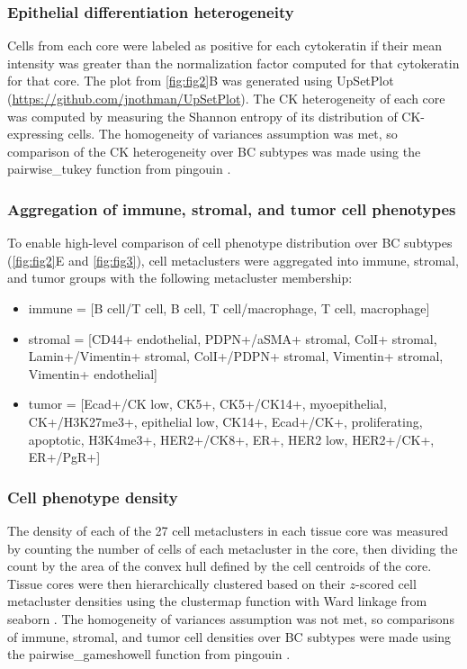 \documentclass[preprint,review,3p,12pt]{elsarticle}
\begin{document}
\subsubsection{Epithelial differentiation heterogeneity}
Cells from each core were labeled as positive for each cytokeratin if their mean intensity was greater than the normalization factor computed for that cytokeratin for that core. The plot from \autoref{fig:fig2}B was generated using UpSetPlot (\url{https://github.com/jnothman/UpSetPlot}). The CK heterogeneity of each core was computed by measuring the Shannon entropy of its distribution of CK-expressing cells. The homogeneity of variances assumption was met, so comparison of the CK heterogeneity over BC subtypes was made using the pairwise\_tukey function from pingouin \cite{pingouin2018}.

\subsubsection{Aggregation of immune, stromal, and tumor cell phenotypes} \label{aggregate}
To enable high-level comparison of cell phenotype distribution over BC subtypes (\autoref{fig:fig2}E and \autoref{fig:fig3}), cell metaclusters were aggregated into immune, stromal, and tumor groups with the following metacluster membership:
\begin{itemize}
    \item immune = [B cell/T cell, B cell, T cell/macrophage, T cell, macrophage]
    \item stromal = [CD44+ endothelial, PDPN+/aSMA+ stromal, ColI+ stromal, Lamin+/Vimentin+ stromal, ColI+/PDPN+ stromal, Vimentin+ stromal, Vimentin+ endothelial]
    \item tumor = [Ecad+/CK low, CK5+, CK5+/CK14+, myoepithelial, CK+/H3K27me3+, epithelial low, CK14+, Ecad+/CK+, proliferating, apoptotic, H3K4me3+, HER2+/CK8+, ER+, HER2 low, HER2+/CK+, ER+/PgR+]
\end{itemize}

\subsubsection{Cell phenotype density}
The density of each of the 27 cell metaclusters in each tissue core was measured by counting the number of cells of each metacluster in the core, then dividing the count by the area of the convex hull defined by the cell centroids of the core. Tissue cores were then hierarchically clustered based on their $z$-scored cell metacluster densities using the clustermap function with Ward linkage from seaborn \cite{seaborn2020}. The homogeneity of variances assumption was not met, so comparisons of immune, stromal, and tumor cell densities over BC subtypes were made using the pairwise\_gameshowell function from pingouin \cite{pingouin2018}.
\end{document}
